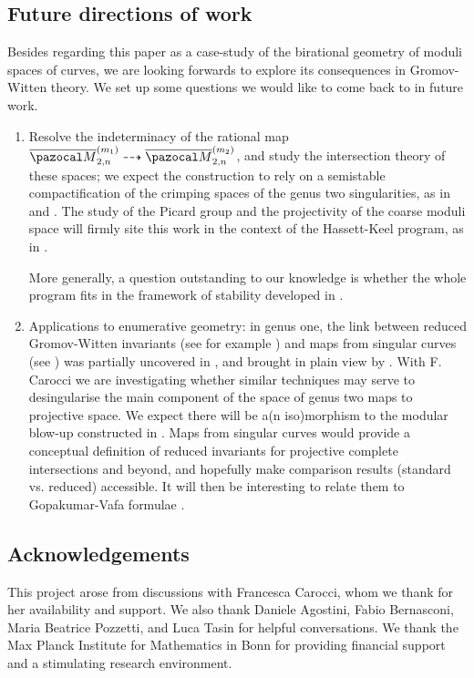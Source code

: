\documentclass[11pt]{amsart}
\newcommand{\oM}{\overline{\pazocal M}}
\theoremstyle{plain}
\theoremstyle{definition}
\begin{document}
\subsection{Future directions of work} Besides regarding this paper as a case-study of the birational geometry of moduli spaces of curves, we are looking forwards to explore its consequences in Gromov-Witten theory. We set up some questions we would like to come back to in future work.
\begin{enumerate}[leftmargin=.7cm]
 \item Resolve the indeterminacy of the rational map $\oM_{2,n}^{(m_1)}\dashrightarrow\oM_{2,n}^{(m_2)}$, and study the intersection theory of these spaces; we expect the construction to rely on a semistable compactification of the crimping spaces of the genus two singularities, as in \cite[\S 1.10]{vdW} and \cite{SMY3}. The study of the Picard group and the projectivity of the coarse moduli space will firmly site this work in the context of the Hassett-Keel program, as in \cite{SMY2}.
 
 More generally, a question outstanding to our knowledge is whether the whole program fits in the framework of stability developed in \cite{DHLinstability}.
 
 \item Applications to enumerative geometry: in genus one, the link between reduced Gromov-Witten invariants (see for example \cite{VZ,Zingerred,LZ}) and maps from singular curves (see \cite{VISC}) was partially uncovered in \cite{BCM}, and brought in plain view by \cite{RSPW1,RSPW2}. With F. Carocci we are investigating whether similar techniques may serve to desingularise the main component of the space of genus two maps to projective space. We expect there will be a(n iso)morphism to the modular blow-up constructed in \cite{HLN}. Maps from singular curves would provide a conceptual definition of reduced invariants for projective complete intersections and beyond, and hopefully make comparison results (standard vs. reduced) accessible. It will then be interesting to relate them to Gopakumar-Vafa formulae \cite{Pandha}.
\end{enumerate}

\subsection{Acknowledgements} This project arose from discussions with Francesca Carocci, whom we thank for her availability and support. We also thank Daniele Agostini, Fabio Bernasconi, Maria Beatrice Pozzetti, and Luca Tasin for helpful conversations. We thank the Max Planck Institute for Mathematics in Bonn for providing financial support and a stimulating research environment.
\end{document}
